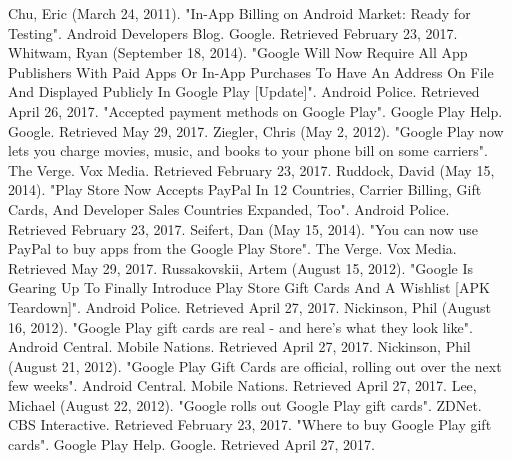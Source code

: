 \documentclass{article}                    %
\begin{document}
Chu, Eric (March 24, 2011). "In-App Billing on Android Market: Ready for Testing". Android Developers Blog. Google. Retrieved February 23, 2017.
Whitwam, Ryan (September 18, 2014). "Google Will Now Require All App Publishers With Paid Apps Or In-App Purchases To Have An Address On File And Displayed Publicly In Google Play [Update]". Android Police. Retrieved April 26, 2017.
"Accepted payment methods on Google Play". Google Play Help. Google. Retrieved May 29, 2017.
Ziegler, Chris (May 2, 2012). "Google Play now lets you charge movies, music, and books to your phone bill on some carriers". The Verge. Vox Media. Retrieved February 23, 2017.
Ruddock, David (May 15, 2014). "Play Store Now Accepts PayPal In 12 Countries, Carrier Billing, Gift Cards, And Developer Sales Countries Expanded, Too". Android Police. Retrieved February 23, 2017.
Seifert, Dan (May 15, 2014). "You can now use PayPal to buy apps from the Google Play Store". The Verge. Vox Media. Retrieved May 29, 2017.
Russakovskii, Artem (August 15, 2012). "Google Is Gearing Up To Finally Introduce Play Store Gift Cards And A Wishlist [APK Teardown]". Android Police. Retrieved April 27, 2017.
Nickinson, Phil (August 16, 2012). "Google Play gift cards are real - and here's what they look like". Android Central. Mobile Nations. Retrieved April 27, 2017.
Nickinson, Phil (August 21, 2012). "Google Play Gift Cards are official, rolling out over the next few weeks". Android Central. Mobile Nations. Retrieved April 27, 2017.
Lee, Michael (August 22, 2012). "Google rolls out Google Play gift cards". ZDNet. CBS Interactive. Retrieved February 23, 2017.
"Where to buy Google Play gift cards". Google Play Help. Google. Retrieved April 27, 2017.
\end{document}
